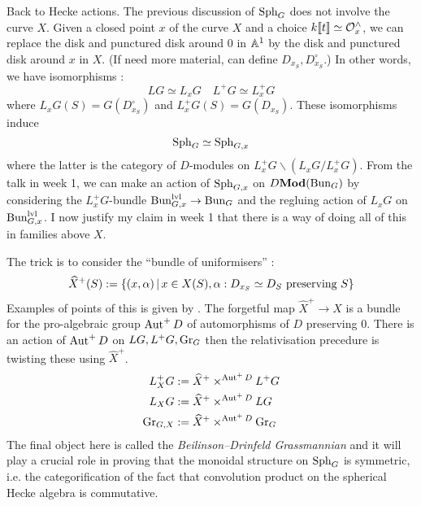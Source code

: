 \documentclass{article}
\begin{document}
Back to Hecke actions.
The previous discussion of $\operatorname{Sph}_G$ does not involve the curve $X$.
Given a closed point $x$ of the curve $X$
and a choice $k\llbracket t \rrbracket \simeq \mathcal{O}^\wedge_x$,
we can replace the disk and punctured disk around $0$ in $\mathbb{A}^1$
by the disk and punctured disk around $x$ in $X$.
(If need more material,
can define $D_{x_S}, D_{x_S}^\circ$.)
In other words, we have isomorphisms : 
\[
  LG \simeq L_x G \,\,\,\,\,\,
  L^+G \simeq L^+_x G
\]
where $L_x G (S) = G(D_{x_S}^\circ)$
and $L_x^+ G(S) =  G(D_{x_S})$.
These isomorphisms induce 
\[
  \operatorname{Sph}_G \simeq \operatorname{Sph}_{G,x}
\]
where the latter is the category of $D$-modules on 
$L^+_x G \backslash (L_x G / L_x^+ G)$.
From the talk in week 1, 
we can make an action of $\operatorname{Sph}_{G , x}$ on $D\mathbf{Mod}(\operatorname{Bun}_G)$
by considering the $L_x^+G$-bundle $\operatorname{Bun}_{G , x}^{\text{lvl}} \to \operatorname{Bun}_G$
and the regluing action of $L_x G$ on $\operatorname{Bun}_{G , x}^{\text{lvl}}$.
I now justify my claim in week 1 that there is a way of doing all of this
in families above $X$.

The trick is to consider the ``bundle of uniformisers'' : 
\[
  \widehat{X}^+(S) := \left\{(x , \alpha) \,|\, x \in X(S) , 
  \alpha : D_{x_S} \simeq D_S \text{ preserving $S$}\right\}
\]
Examples of points of this is given by 
\cite[\href{https://stacks.math.columbia.edu/tag/05D5}{Tag 05D5}]{stacks-project}.
The forgetful map $\widehat{X}^+ \to X$ is a bundle for
the pro-algebraic group $\operatorname{Aut}^+ D$ of automorphisms of $D$
preserving $0$.
There is an action of $\operatorname{Aut}^+ D$ on $LG , L^+ G , \operatorname{Gr}_G$
then the relativisation precedure is twisting these
using $\widehat{X}^+$.
\begin{align*}
  L_X^+ G &:= \widehat{X}^+ \times^{\operatorname{Aut}^+ D} L^+ G \\
  L_X G &:= \widehat{X}^+ \times^{\operatorname{Aut}^+ D} L G \\
  \operatorname{Gr}_{G , X} &:= \widehat{X}^+ \times^{\operatorname{Aut}^+ D} \operatorname{Gr}_G
\end{align*}
The final object here is called the \emph{Beilinson--Drinfeld Grassmannian}
and it will play a crucial role in proving
that the monoidal structure on $\operatorname{Sph}_G$ is symmetric,
i.e. the categorification of the fact that
convolution product on the spherical Hecke algebra is commutative.



\printbibliography
\end{document}
